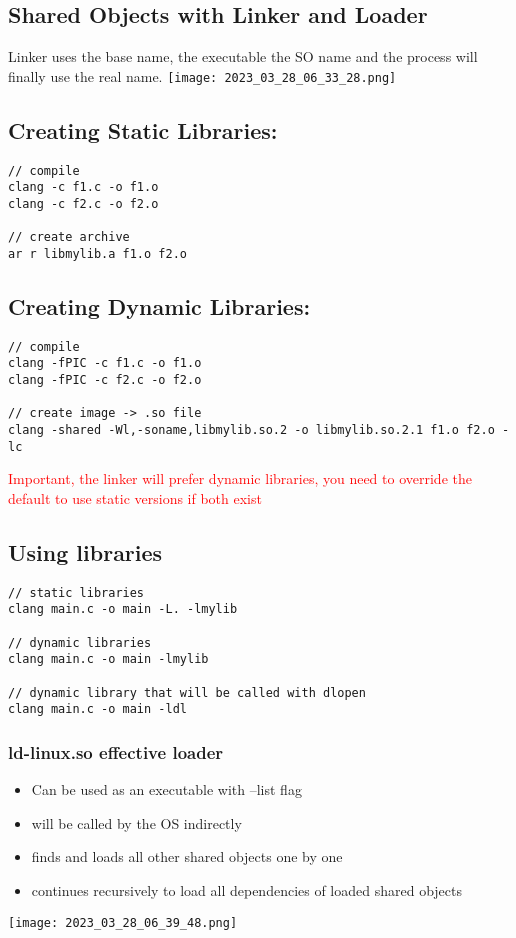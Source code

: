 \documentclass[main.tex,fontsize=8pt,paper=a4,paper=portrait,DIV=calc,]{scrartcl}
\begin{document}
\subsection{Shared Objects with Linker and Loader}
Linker uses the base name, the executable the SO name and the process will finally use the real name.\newline
\texttt{[image: 2023\_03\_28\_06\_33\_28.png]}

\subsection{Creating Static Libraries:}
\begin{lstlisting}
// compile 
clang -c f1.c -o f1.o
clang -c f2.c -o f2.o

// create archive
ar r libmylib.a f1.o f2.o
\end{lstlisting}

\subsection{Creating Dynamic Libraries:}
\begin{lstlisting}
// compile
clang -fPIC -c f1.c -o f1.o
clang -fPIC -c f2.c -o f2.o

// create image -> .so file
clang -shared -Wl,-soname,libmylib.so.2 -o libmylib.so.2.1 f1.o f2.o -lc
\end{lstlisting}
\textcolor{red}{Important, the linker will prefer dynamic libraries, you need to override the default to use static versions if both exist}

\subsection{Using libraries}
\begin{lstlisting}
// static libraries
clang main.c -o main -L. -lmylib

// dynamic libraries
clang main.c -o main -lmylib

// dynamic library that will be called with dlopen
clang main.c -o main -ldl
\end{lstlisting}

\subsubsection{ld-linux.so effective loader}
\begin{itemize}
\item Can be used as an executable with --list flag
\item will be called by the OS indirectly
\item finds and loads all other shared objects one by one 
\item continues recursively to load all dependencies of loaded shared objects
\end{itemize} 
\texttt{[image: 2023\_03\_28\_06\_39\_48.png]}
\end{document}
